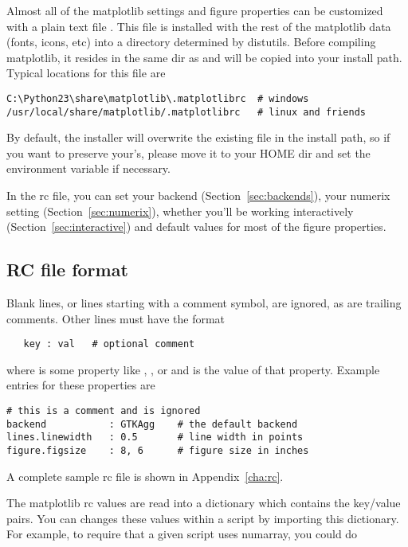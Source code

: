 \documentclass[]{book}
\begin{document}
Almost all of the matplotlib settings and figure properties can be
customized with a plain text file .  This file is
installed with the rest of the matplotlib data (fonts, icons, etc)
into a directory determined by distutils.  Before compiling
matplotlib, it resides in the same dir as  and will be
copied into your install path.  Typical locations for this file are

\begin{verbatim}
C:\Python23\share\matplotlib\.matplotlibrc  # windows
/usr/local/share/matplotlib/.matplotlibrc   # linux and friends  
\end{verbatim}

\noindent By default, the installer will overwrite the existing file in
the install path, so if you want to preserve your's, please move it to
your HOME dir and set the environment variable if necessary.

In the rc file, you can set your backend (Section~\ref{sec:backends}),
your numerix setting (Section~\ref{sec:numerix}), whether you'll be
working interactively (Section~\ref{sec:interactive}) and default
values for most of the figure properties.  


\subsection{RC file format}

Blank lines, or lines starting with a comment symbol, are ignored,
as are trailing comments.  Other lines must have the format

\begin{lstlisting}
   key : val   # optional comment
\end{lstlisting}

\noindent where  is some property like ,
, or  and  is the value
of that property.  Example entries for these properties are

\begin{lstlisting}
# this is a comment and is ignored
backend           : GTKAgg    # the default backend
lines.linewidth   : 0.5       # line width in points
figure.figsize    : 8, 6      # figure size in inches
\end{lstlisting}

\noindent A complete sample rc file is shown in Appendix~\ref{cha:rc}.

The matplotlib rc values are read into a dictionary  which
contains the key/value pairs.  You can changes these values within a
script by importing this dictionary.  For example, to require that a
given script uses numarray, you could do
\end{document}
